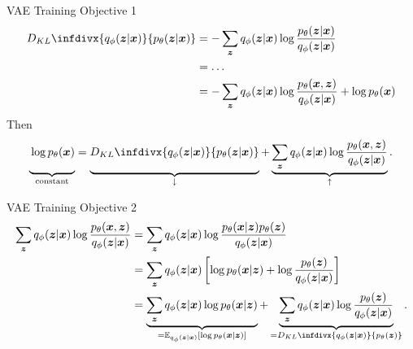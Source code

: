 \documentclass{beamer}
\newcommand{\kldiv}{D_{KL}\infdivx}
\begin{document}
\begin{frame}{VAE Training Objective 1}
\begin{align*}
\kldiv{q_\phi(\bm{z}|\bm{x})}{p_\theta(\bm{z}|\bm{x})} &= -\sum_{\bm{z}} q_\phi(\bm{z}|\bm{x}) \log \frac{p_\theta(\bm{z}|\bm{x})}{q_\phi(\bm{z}|\bm{x})} \\
            &= \ldots \\
            &= -\sum_{\bm{z}} q_\phi(\bm{z}|\bm{x}) \log \frac{p_\theta(\bm{x},\bm{z})}{q_\phi(\bm{z}|\bm{x})} + \log p_\theta(\bm{x})
        \end{align*}
        Then
        \begin{align*}
            \underbrace{\vphantom{\sum_{\bm{z}} x}\log p_\theta(\bm{x})}_{\text{constant}} =  \underbrace{\vphantom{\sum_{\bm{z}} x}\kldiv{q_\phi(\bm{z}|\bm{x})}{p_\theta(\bm{z}|\bm{x})}}_{\downarrow}  + \underbrace{\sum_{\bm{z}} q_\phi(\bm{z}|\bm{x}) \log \frac{p_\theta(\bm{x},\bm{z})}{q_\phi(\bm{z}|\bm{x})}}_{\uparrow}.
        \end{align*}
    \end{frame}
    \begin{frame}{VAE Training Objective 2}
        \begin{align*}
            \sum_{\bm{z}} q_\phi(\bm{z}|\bm{x}) \log \frac{p_\theta(\bm{x},\bm{z})}{q_\phi(\bm{z}|\bm{x})} &= \sum_{\bm{z}} q_\phi(\bm{z}|\bm{x}) \log \frac{p_\theta(\bm{x}|\bm{z})p_\theta(\bm{z})}{q_\phi(\bm{z}|\bm{x})}\\
            &= \sum_{\bm{z}} q_\phi(\bm{z}|\bm{x}) \left[ \log p_\theta(\bm{x}|\bm{z}) + \log \frac{p_\theta(\bm{z})}{q_\phi(\bm{z}|\bm{x})} \right]\\
            &= \underbrace{\sum_{\bm{z}} q_\phi(\bm{z}|\bm{x})\log p_\theta(\bm{x}|\bm{z})}_{=\mathbb{E}_{q_\phi(\bm{z}|\bm{x})}\left[ \log p_\theta(\bm{x}|\bm{z}) \right]} + \underbrace{\sum_{\bm{z}} q_\phi(\bm{z}|\bm{x})\log \frac{p_\theta(\bm{z})}{q_\phi(\bm{z}|\bm{x})}}_{=\kldiv{q_\phi(\bm{z}|\bm{x})}{p_\theta(\bm{z})}}. \label{eq:elbo_error_term}
        \end{align*}
    \end{frame}
\end{document}
